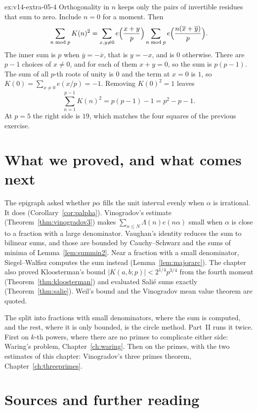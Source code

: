 \begin{solution}{ex:v14-extra-05-4}
\idea Orthogonality in $n$ keeps only the pairs of invertible residues that sum to zero.
\writeup Include $n=0$ for a moment. Then
\[
\sum_{n\bmod p}K(n)^2=\sum_{x,y\ne0}e\Bigl(\frac{x+y}p\Bigr)\sum_{n\bmod p}e\Bigl(\frac{n(\overline x+\overline y)}p\Bigr).
\]
The inner sum is $p$ when $\overline y=-\overline x$, that is $y=-x$, and is $0$ otherwise. There are $p-1$ choices of $x\ne0$, and for each of them $x+y=0$, so the sum is $p(p-1)$. The sum of all $p$-th roots of unity is $0$ and the term at $x=0$ is $1$, so $K(0)=\sum_{x\ne0}e(x/p)=-1$. Removing $K(0)^2=1$ leaves
\[
\sum_{n=1}^{p-1}K(n)^2=p(p-1)-1=p^2-p-1.
\]
At $p=5$ the right side is $19$, which matches the four squares of the previous exercise.
\end{solution}

\section{What we proved, and what comes next}

The epigraph asked whether $p\alpha$ fills the unit interval evenly when $\alpha$ is irrational. It does (Corollary~\ref{cor:palpha}). Vinogradov's estimate (Theorem~\ref{thm:vinogradov3}) makes $\sum_{n\le N}\Lambda(n)e(n\alpha)$ small when $\alpha$ is close to a fraction with a large denominator. Vaughan's identity reduces the sum to bilinear sums, and those are bounded by Cauchy--Schwarz and the sums of minima of Lemma~\ref{lem:summin2}. Near a fraction with a small denominator, Siegel--Walfisz computes the sum instead (Lemma~\ref{lem:majorarc}). The chapter also proved Kloosterman's bound $|K(a,b;p)|<2^{1/4}p^{3/4}$ from the fourth moment (Theorem~\ref{thm:kloosterman}) and evaluated Salié sums exactly (Theorem~\ref{thm:salie}). Weil's bound and the Vinogradov mean value theorem are quoted.

The split into fractions with small denominators, where the sum is computed, and the rest, where it is only bounded, is the circle method. Part~II runs it twice. First on $k$-th powers, where there are no primes to complicate either side: Waring's problem, Chapter~\ref{ch:waring}. Then on the primes, with the two estimates of this chapter: Vinogradov's three primes theorem, Chapter~\ref{ch:threeprimes}.

\section*{Sources and further reading}

